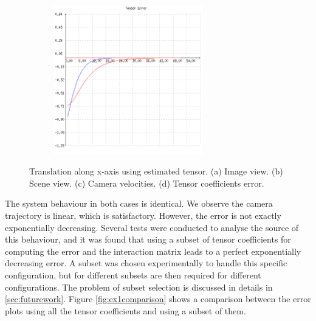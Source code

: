 \begin{figure}[ht!]
\begin{mdframed}[linecolor=black!30,backgroundcolor=black!5]
\begin{subfigure}{.48\textwidth}
    \caption{}
    \label{fig:ex1cvelocity}
  \end{subfigure}
  \begin{subfigure}{.48\textwidth}
    \centering
    \includegraphics[width=65mm]{figures/plots/ex1cerror.png}
    \caption{}
    \label{fig:ex1cerror}
  \end{subfigure}
  \caption{Translation along x-axis using estimated tensor. (a) Image view. (b) Scene view. (c) Camera velocities. (d) Tensor coefficients error.}
  \label{fig:ex1c}
\end{mdframed}
\end{figure}
\clearpage

The system behaviour in both cases is identical. We observe the camera trajectory is linear, which is satisfactory. However, the error is not exactly exponentially decreasing. Several tests were conducted to analyse the source of this behaviour, and it was found that using a subset of tensor coefficients for computing the error and the interaction matrix leads to a perfect exponentially decreasing error. A subset was chosen experimentally to handle this specific configuration, but for different subsets are then required for different configurations. The problem of subset selection is discussed in details in \ref{sec:futurework}. Figure \ref{fig:ex1comparison} shows a comparison between the error plots using all the tensor coefficients and using a subset of them.

